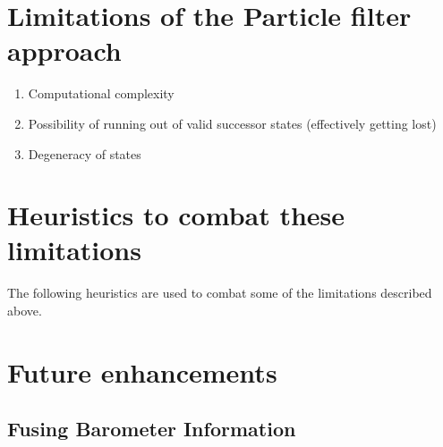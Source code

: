 \section{Limitations of the Particle filter approach}

\begin{enumerate}
\item Computational complexity
\item Possibility of running out of valid successor states (effectively getting lost)
\item Degeneracy of states
\end{enumerate}

\section{Heuristics to combat these limitations}

The following heuristics are used to combat some of the limitations 
described above.

\section{Future enhancements}
\subsection{Fusing Barometer Information}

